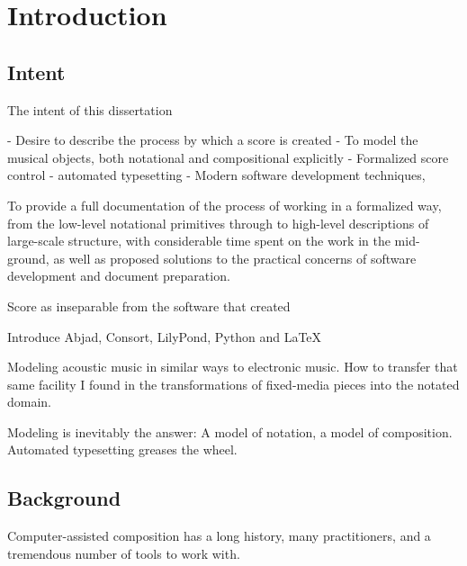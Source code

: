 \chapter{Introduction}
\label{chap:introduction}


\begin{markdown}


\end{markdown}

\section{Intent}
\label{sec:intent}

The intent of this dissertation

-   Desire to describe the process by which a score is created
-   To model the musical objects, both notational and compositional explicitly
-   Formalized score control
-   automated typesetting
-   Modern software development techniques, 

To provide a full documentation of the process of working in a formalized way,
from the low-level notational primitives through to high-level descriptions of
large-scale structure, with considerable time spent on the work in the
mid-ground, as well as proposed solutions to the practical concerns of software
development and document preparation.

Score as inseparable from the software that created

Introduce Abjad, Consort, LilyPond, Python and \LaTeX{}

Modeling acoustic music in similar ways to electronic music. How to transfer
that same facility I found in the transformations of fixed-media pieces into 
the notated domain.

Modeling is inevitably the answer: A model of notation, a model of composition.
Automated typesetting greases the wheel.

\section{Background}
\label{sec:background}

Computer-assisted composition has a long history, many practitioners, and a
tremendous number of tools to work with.

